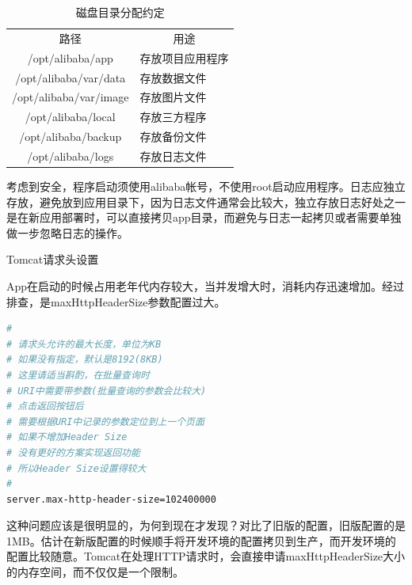 \documentclass[8pt]{book}
\makeatletter
\numberwithin{dummy}{section}
\theoremstyle{ocrenumbox}
\theoremstyle{blacknumex}
\theoremstyle{blacknumbox}
\theoremstyle{ocrenum}
\renewcommand{\subsection}{\@startsection {subsection}{2}{\z@}
	{-3ex \@plus -0.1ex \@minus -.4ex}
	{0.5ex \@plus.2ex }
	{\normalfont\sffamily\bfseries}}
\makeatother
\begin{document}
\begin{table}[htbp]
	\caption{磁盘目录分配约定}
	\label{table:}
	\begin{center}
		\begin{tabular}{|c|p{5cm}|}
			\hline
			\multirow{1}{*}{路径}
			& \multicolumn{1}{c|}{用途}\\			
			\cline{1-2}
			/opt/alibaba/app &  存放项目应用程序  \\
			\hline
			/opt/alibaba/var/data & 存放数据文件 \\
			\hline			
			/opt/alibaba/var/image & 存放图片文件 \\
			\hline
			/opt/alibaba/local & 存放三方程序 \\
			\hline
			/opt/alibaba/backup & 存放备份文件 \\
			\hline
			/opt/alibaba/logs & 存放日志文件 \\
			\hline														
		\end{tabular}	
	\end{center}
\end{table}

考虑到安全，程序启动须使用alibaba帐号，不使用root启动应用程序。日志应独立存放，避免放到应用目录下，因为日志文件通常会比较大，独立存放日志好处之一是在新应用部署时，可以直接拷贝app目录，而避免与日志一起拷贝或者需要单独做一步忽略日志的操作。




\subsection{Tomcat请求头设置}

App在启动的时候占用老年代内存较大，当并发增大时，消耗内存迅速增加。经过排查，是maxHttpHeaderSize参数配置过大。

\begin{lstlisting}[language=Bash]
#
# 请求头允许的最大长度，单位为KB
# 如果没有指定，默认是8192(8KB)
# 这里请适当斟酌，在批量查询时
# URI中需要带参数(批量查询的参数会比较大)
# 点击返回按钮后
# 需要根据URI中记录的参数定位到上一个页面
# 如果不增加Header Size
# 没有更好的方案实现返回功能
# 所以Header Size设置得较大
#
server.max-http-header-size=102400000
\end{lstlisting}

这种问题应该是很明显的，为何到现在才发现？对比了旧版的配置，旧版配置的是1MB。估计在新版配置的时候顺手将开发环境的配置拷贝到生产，而开发环境的配置比较随意。Tomcat在处理HTTP请求时，会直接申请maxHttpHeaderSize大小的内存空间，而不仅仅是一个限制。
\end{document}
